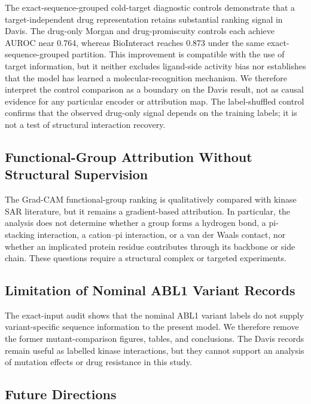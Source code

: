 \documentclass[fleqn,10pt]{wlscirep}
\begin{document}
The \begingroup\color{red}exact-sequence-grouped cold-target\endgroup{} diagnostic controls demonstrate that a target-independent
drug representation retains substantial ranking signal in Davis.  The
drug-only Morgan and drug-promiscuity controls each achieve AUROC near 0.764,
whereas BioInteract reaches 0.873 under the same exact-sequence-grouped
partition.  This improvement is compatible with the use of target information,
but it neither excludes ligand-side activity bias nor establishes that the model
has learned a molecular-recognition mechanism.  We therefore interpret the
control comparison as a boundary on the Davis result, not as causal evidence for
any particular encoder or attribution map.  The label-shuffled control confirms
that the observed drug-only signal depends on the training labels; it is not a
test of structural interaction recovery.
\endgroup

\endgroup
\begingroup\color{red}
\subsection{Functional-Group Attribution Without Structural Supervision}

The Grad-CAM functional-group ranking is qualitatively compared with kinase
SAR literature, but it remains a gradient-based attribution.  In particular,
the analysis does not determine whether a group forms a hydrogen bond, a
pi-stacking interaction, a cation--pi interaction, or a van der Waals contact,
nor whether an implicated protein residue contributes through its backbone or
side chain.  These questions require a structural complex or targeted
experiments.\cite{zhang2009targeting}

\endgroup
\begingroup\color{red}
\subsection{Limitation of Nominal ABL1 Variant Records}

The exact-input audit shows that the nominal ABL1 variant labels do not supply
variant-specific sequence information to the present model. We therefore remove
the former mutant-comparison figures, tables, and conclusions. The Davis records
remain useful as labelled kinase interactions, but they cannot support an
analysis of mutation effects or drug resistance in this study.
\endgroup

\begingroup\color{red}
\subsection{Future Directions}
\end{document}
